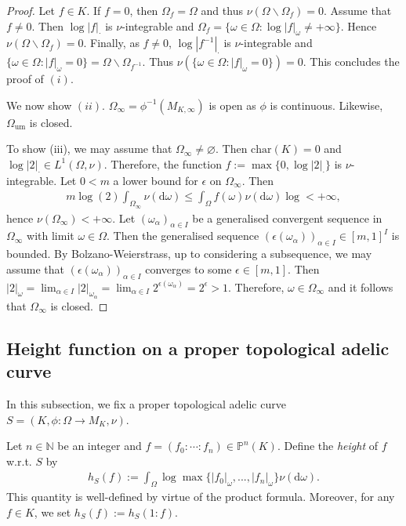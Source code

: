 \documentclass [11pt,reqno]{amsart}
\def\bN{{\mathbb{N}}}
\newcommand{\1}{\mathmybb{1}}
\def\diff{\mathrm{d}}
\def\um{\operatorname{um}}
\def\setminus{\smallsetminus}
\def\emptyset{\varnothing}
\begin{document}
\begin{proof}
Let $f\in K$. If $f= 0$, then $\Omega_f= \Omega$ and thus $\nu(\Omega\setminus \Omega_f) = 0$. Assume that $f\neq 0$. Then $\log|f|_{\cdot}$ is $\nu$-integrable and $\Omega_f = \{\omega\in\Omega : \log|f|_{\omega} \neq +\infty\}$. Hence $\nu(\Omega\setminus \Omega_f)=0$. Finally, as $f\neq 0$, $\log|f^{-1}|_{\cdot}$ is $\nu$-integrable and $\{\omega\in\Omega : |f|_{\omega} = 0\} = \Omega\setminus \Omega_{f^{-1}}$. Thus $\nu\left(\{\omega\in\Omega : |f|_{\omega} = 0\}\right) = 0$. This concludes the proof of $(i)$.

We now show $(ii)$. $\Omega_{\infty} = \phi^{-1}(M_{K,\infty})$ is open as $\phi$ is continuous. Likewise, $\Omega_{\um}$ is closed. 

To show (iii), we may assume that $\Omega_{\infty} \neq \emptyset$. Then $\mathrm{char}(K)=0$ and $\log|2|_{\cdot} \in L^1(\Omega,\nu)$. Therefore, the function $f:=\max\{0,\log|2|_{\cdot}\}$ is $\nu$-integrable. Let $0<m$ a lower bound for $\epsilon$ on $\Omega_{\infty}$. Then 
\begin{align*}
m\log(2)\int_{\Omega_{\infty}}\nu(\diff\omega) \leq \int_{\Omega} f(\omega) \nu(\diff\omega)\log < +\infty,
\end{align*}
hence $\nu(\Omega_{\infty}) < +\infty$. Let $(\omega_{\alpha})_{\alpha\in I}$ be a generalised convergent sequence in $\Omega_{\infty}$ with limit $\omega\in \Omega$. Then the generalised sequence $(\epsilon(\omega_{\alpha}))_{\alpha\in I}\in  [m,1]^{I}$ is bounded. By Bolzano-Weierstrass, up to considering a subsequence, we may assume that $(\epsilon(\omega_{\alpha}))_{\alpha\in I}$ converges to some $\epsilon\in[m,1]$. Then $|2|_{\omega}=\lim_{\alpha \in I}|2|_{\omega_{\alpha}} = \lim_{\alpha \in I}2^{\epsilon(\omega_{\alpha})}=2^{\epsilon}>1$. Therefore, $\omega\in \Omega_{\infty}$ and it follows that $\Omega_{\infty}$ is closed.
\end{proof}

\subsection{Height function on a proper topological adelic curve}
\label{sub:height_function_topological_adelic curve}

In this subsection, we fix a proper topological adelic curve $S=(K,\phi:\Omega\to M_{K},\nu)$.

\begin{definition}
\label{def:GVF_height_tac}
Let $n\in \bN$ be an integer and $f=(f_{0}:\cdots:f_{n})\in \mathbb{P}^{n}(K)$. Define the \emph{height} of $f$ w.r.t. $S$ by
\begin{align*}
h_{S}(f) := \int_{\Omega}\log\max\{|f_{0}|_{\omega},...,|f_{n}|_{\omega}\}\nu(\diff\omega).
\end{align*} 
This quantity is well-defined by virtue of the product formula. Moreover, for any $f\in K$, we set $h_{S}(f):=h_{S}(1:f)$. 
\end{definition}
\end{document}
